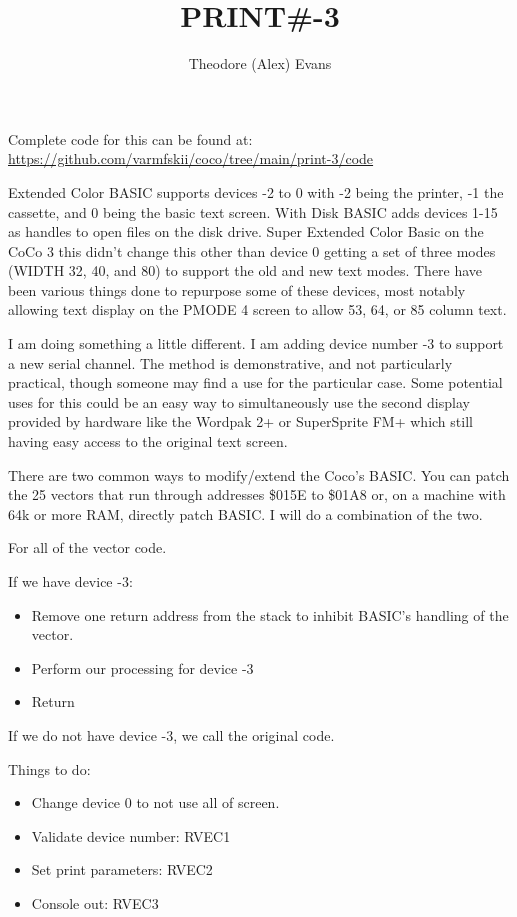 \documentclass{article}
\title{PRINT\#-3}
\author{Theodore (Alex) Evans}
\begin{document}
\maketitle

Complete code for this can be found at: \url{https://github.com/varmfskii/coco/tree/main/print-3/code}

Extended Color BASIC supports devices -2 to 0 with -2 being the
printer, -1 the cassette, and 0 being the basic text screen. With Disk
BASIC adds devices 1-15 as handles to open files on the disk
drive. Super Extended Color Basic on the CoCo 3 this didn't change
this other than device 0 getting a set of three modes (WIDTH 32, 40,
and 80) to support the old and new text modes. There have been various
things done to repurpose some of these devices, most notably allowing
text display on the PMODE 4 screen to allow 53, 64, or 85 column text.

I am doing something a little different. I am adding device number -3
to support a new serial channel. The method is demonstrative, and not
particularly practical, though someone may find a use for the
particular case. Some potential uses for this could be an easy way to
simultaneously use the second display provided by hardware like the
Wordpak 2+ or SuperSprite FM+ which still having easy access to the
original text screen.

There are two common ways to modify/extend the Coco's BASIC. You can
patch the 25 vectors that run through addresses \$015E to \$01A8 or,
on a machine with 64k or more RAM, directly patch BASIC. I will do a
combination of the two.

For all of the vector code.

If we have device -3:

\begin{itemize}
\item Remove one return address from the stack to inhibit BASIC's
  handling of the vector.
\item Perform our processing for device -3
\item Return
\end{itemize}

If we do not have device -3, we call the original code.

Things to do:
\begin{itemize}
\item Change device 0 to not use all of screen.
\item Validate device number:  RVEC1
\item Set print parameters: RVEC2
\item Console out: RVEC3
\end{itemize}
\end{document}
